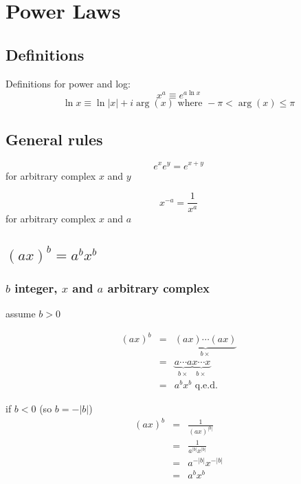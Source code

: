 \documentclass{article}
\begin{document}
\section{Power Laws}

\subsection{Definitions}

Definitions for power and log:
\begin{equation}
x^a \equiv e^{a \ln x}
\end{equation}
\begin{equation}
\ln x \equiv \ln |x| + i \arg(x) \mbox{ where } -\pi < \arg(x) \le \pi
\end{equation}

\subsection{General rules}

\begin{equation}
e^x e^y = e^{x+y}
\end{equation}
for arbitrary complex $x$ and $y$

\begin{equation}
x^{-a} = \frac{1}{x^a}
\end{equation}
for arbitrary complex $x$ and $a$

\subsection{$(ax)^b=a^b x^b$}

\subsubsection{$b$ integer, $x$ and $a$ arbitrary complex}

assume $b>0$

\begin{eqnarray}
(ax)^b & = & \underbrace{(ax) \cdots (ax)}_{b \times}
\nonumber\\
& = & \underbrace{a \cdots a}_{b \times}
      \underbrace{x \cdots x}_{b \times}
\nonumber\\
& = & a^b x^b \mbox{ q.e.d.}
\end{eqnarray}

if $b<0$ (so $b=-|b|$)
\begin{eqnarray}
(ax)^b & = & \frac{1}{(ax)^{|b|}}
\nonumber\\
& = & \frac{1}{a^{|b|} x^{|b|}}
\nonumber\\
& = & a^{-|b|} x^{-|b|}
\nonumber\\
& = & a^b x^b
\end{eqnarray}
\end{document}
